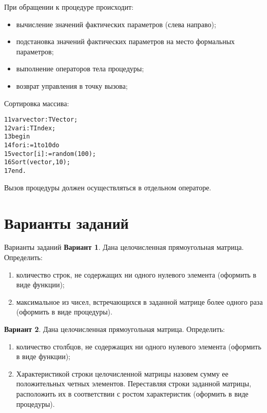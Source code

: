 \documentclass{beamer}
\begin{document}
\begin{frame}[fragile]
При обращении к процедуре происходит:
\begin{itemize}
\item вычисление значений фактических параметров (слева направо);
\item подстановка значений фактических параметров на место формальных параметров;
\item выполнение операторов тела процедуры;
\item возврат управления в точку вызова;
\end{itemize}
Сортировка массива:
\begin{alltt}
11 var vector: TVector; 
12 var i: TIndex; 
13 begin
14   for i := 1 to 10 do
15      vector[i] := random(100);
16   Sort(vector, 10);
17 end.
\end{alltt}
Вызов процедуры должен осуществляться в отдельном операторе.
\end{frame}

\section{Варианты заданий}
\begin{frame}{Варианты заданий}
\textbf{Вариант 1}. Дана целочисленная прямоугольная матрица. Определить:
\begin{enumerate}
\item количество строк, не содержащих ни одного нулевого элемента (оформить в виде функции);
\item максимальное из чисел, встречающихся в заданной матрице более одного раза (оформить в виде процедуры).
\end{enumerate}
\textbf{Вариант 2}. Дана целочисленная прямоугольная матрица. Определить:
\begin{enumerate}
\item количество столбцов, не содержащих ни одного нулевого элемента (оформить в виде функции); 
\item Характеристикой строки целочисленной матрицы назовем сумму ее положительных четных элементов. Переставляя строки заданной матрицы, расположить их в соответствии с ростом характеристик (оформить в виде процедуры).
\end{enumerate}
\end{frame} 
\end{document}
